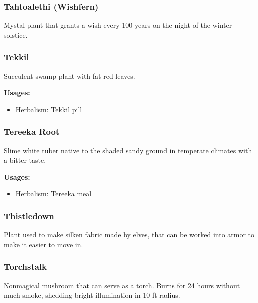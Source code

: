 \subsubsection{Tahtoalethi (Wishfern)}

Mystal plant that grants a wish every 100 years on the night of the winter solstice.

\subsubsection{Tekkil}
\label{Tekkil}

Succulent swamp plant with fat red leaves.

\vspace{5mm}

\textbf{Usages:}

\begin{itemize}[noitemsep]
\item[] Herbalism: \hyperref[Tekkil pill]{Tekkil pill}
\end{itemize}

\subsubsection{Tereeka Root}
\label{Tereeka Root}

Slime white tuber native to the shaded sandy ground in temperate climates with a bitter taste.

\vspace{5mm}

\textbf{Usages:}

\begin{itemize}[noitemsep]
\item[] Herbalism: \hyperref[Tereeka meal]{Tereeka meal}
\end{itemize}

\subsubsection{Thistledown}

Plant used to make silken fabric made by elves, that can be worked into armor to make it easier to move in.

\subsubsection{Torchstalk}

Nonmagical mushroom that can serve as a torch. Burns for 24 hours without much smoke, shedding bright illumination in 10 ft radius.

